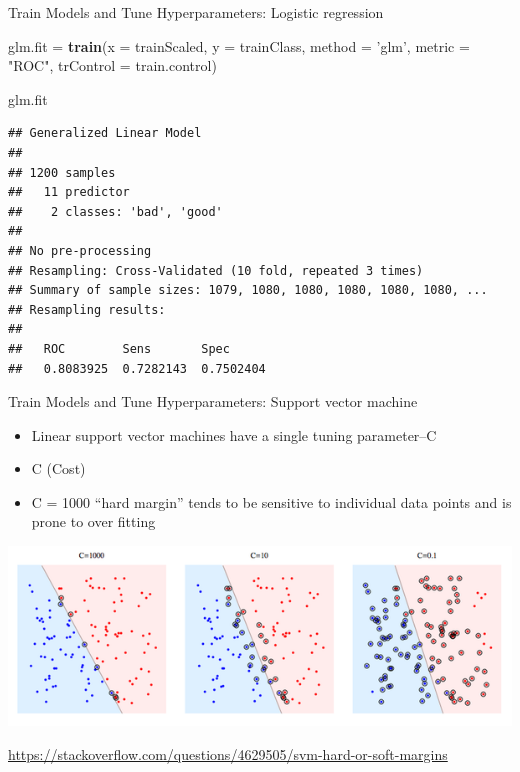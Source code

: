 \documentclass[ignorenonframetext,]{beamer}
\newenvironment{Shaded}{\begin{snugshade}}{\end{snugshade}}
\newcommand{\KeywordTok}[1]{\textcolor[rgb]{0.13,0.29,0.53}{\textbf{#1}}}
\newcommand{\DataTypeTok}[1]{\textcolor[rgb]{0.13,0.29,0.53}{#1}}
\newcommand{\StringTok}[1]{\textcolor[rgb]{0.31,0.60,0.02}{#1}}
\newcommand{\NormalTok}[1]{#1}
\begin{document}
\begin{frame}[fragile]{Train Models and Tune Hyperparameters: Logistic
regression}

\begin{Shaded}
\begin{Highlighting}[]
\NormalTok{glm.fit =}\StringTok{ }\KeywordTok{train}\NormalTok{(}\DataTypeTok{x =}\NormalTok{ trainScaled, }\DataTypeTok{y =}\NormalTok{ trainClass,}
   \DataTypeTok{method =} \StringTok{'glm'}\NormalTok{, }\DataTypeTok{metric =} \StringTok{"ROC"}\NormalTok{,}
   \DataTypeTok{trControl =}\NormalTok{ train.control) }

\NormalTok{glm.fit}
\end{Highlighting}
\end{Shaded}

\begin{verbatim}
## Generalized Linear Model 
## 
## 1200 samples
##   11 predictor
##    2 classes: 'bad', 'good' 
## 
## No pre-processing
## Resampling: Cross-Validated (10 fold, repeated 3 times) 
## Summary of sample sizes: 1079, 1080, 1080, 1080, 1080, 1080, ... 
## Resampling results:
## 
##   ROC        Sens       Spec     
##   0.8083925  0.7282143  0.7502404
\end{verbatim}

\end{frame}

\begin{frame}{Train Models and Tune Hyperparameters: Support vector
machine}

\begin{itemize}
\item
  Linear support vector machines have a single tuning parameter--C
\item
  C (Cost)
\item
  C = 1000 ``hard margin'' tends to be sensitive to individual data
  points and is prone to over fitting
\end{itemize}

\includegraphics[width=0.85\linewidth]{SVM-Cparameter}

\url{https://stackoverflow.com/questions/4629505/svm-hard-or-soft-margins}

\end{frame}
\end{document}
